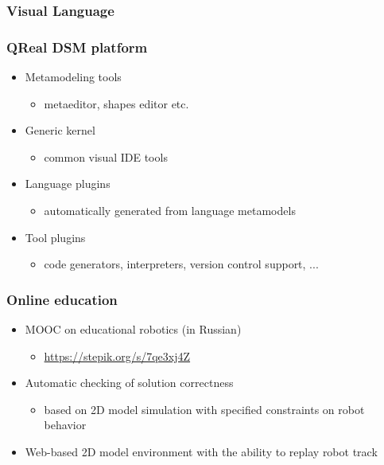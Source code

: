\documentclass[xetex,mathserif,serif]{beamer}
\begin{document}
	\begin{frame}
		\frametitle{Visual Language}
	\end{frame}

	\begin{frame}
		\frametitle{QReal DSM platform}
		\begin{itemize}
			\item Metamodeling tools
			\begin{itemize}
				\item metaeditor, shapes editor etc.
			\end{itemize}
			\item Generic kernel
			\begin{itemize}
				\item common visual IDE tools
			\end{itemize}
			\item Language plugins
			\begin{itemize}
				\item automatically generated from language metamodels
			\end{itemize}
			\item Tool plugins
			\begin{itemize}
				\item code generators, interpreters, version control support, ...
			\end{itemize}
		\end{itemize}
	\end{frame}

	\begin{frame}
		\frametitle{Online education}
		\begin{itemize}
			\item MOOC on educational robotics (in Russian)
			\begin{itemize}
				\item \href{https://stepik.org/s/7qe3xj4Z}{https://stepik.org/s/7qe3xj4Z}
			\end{itemize}
			\item Automatic checking of solution correctness
			\begin{itemize}
				\item based on 2D model simulation with specified constraints on robot behavior
			\end{itemize}
			\item Web-based 2D model environment with the ability to replay robot track
		\end{itemize}
	\end{frame}
\end{document}

